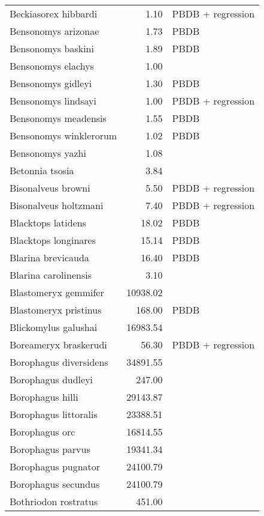 \begin{table}[ht]
\begin{tabular}{lrl}
  Beckiasorex hibbardi & 1.10 & PBDB + regression \\ 
  Bensonomys arizonae & 1.73 & PBDB \\ 
  Bensonomys baskini & 1.89 & PBDB \\ 
  Bensonomys elachys & 1.00 & \cite{Kirk2011} \\ 
  Bensonomys gidleyi & 1.30 & PBDB \\ 
  Bensonomys lindsayi & 1.00 & PBDB + regression \\ 
  Bensonomys meadensis & 1.55 & PBDB \\ 
  Bensonomys winklerorum & 1.02 & PBDB \\ 
  Bensonomys yazhi & 1.08 & \cite{Rose2013a} \\ 
  Betonnia tsosia & 3.84 & \cite{Clemens2005} \\ 
  Bisonalveus browni & 5.50 & PBDB + regression \\ 
  Bisonalveus holtzmani & 7.40 & PBDB + regression \\ 
  Blacktops latidens & 18.02 & PBDB \\ 
  Blacktops longinares & 15.14 & PBDB \\ 
  Blarina brevicauda & 16.40 & PBDB \\ 
  Blarina carolinensis & 3.10 & \cite{Smith2004} \\ 
  Blastomeryx gemmifer & 10938.02 & \cite{Tomiya2013} \\ 
  Blastomeryx pristinus & 168.00 & PBDB \\ 
  Blickomylus galushai & 16983.54 & \cite{Tomiya2013} \\ 
  Boreameryx braskerudi & 56.30 & PBDB + regression \\ 
  Borophagus diversidens & 34891.55 & \cite{Tomiya2013} \\ 
  Borophagus dudleyi & 247.00 & \cite{Dalquest1978} \\ 
  Borophagus hilli & 29143.87 & \cite{Tomiya2013} \\ 
  Borophagus littoralis & 23388.51 & \cite{Tomiya2013} \\ 
  Borophagus orc & 16814.55 & \cite{Tomiya2013} \\ 
  Borophagus parvus & 19341.34 & \cite{Tomiya2013} \\ 
  Borophagus pugnator & 24100.79 & \cite{Tomiya2013} \\ 
  Borophagus secundus & 24100.79 & \cite{Tomiya2013} \\ 
  Bothriodon rostratus & 451.00 & \cite{Cassiliano2008} \\ 

\end{tabular}
\end{table}
